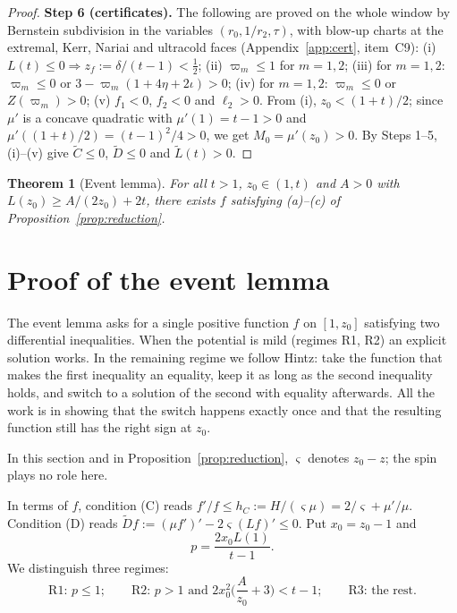 \documentclass[11pt]{amsart}
\newtheorem{theorem}{Theorem}[section]
\theoremstyle{definition}
\theoremstyle{remark}
\numberwithin{equation}{section}
\begin{document}
\begin{proof}
\smallskip\noindent\textbf{Step 6 (certificates).} The following are proved on the whole window by Bernstein subdivision in the variables
$(r_0,1/r_2,\tau)$, with blow-up charts at the extremal, Kerr, Nariai and ultracold faces (Appendix~\ref{app:cert},
item~C9):
(i) $L(t)\le0\Rightarrow z_f:=\delta/(t-1)<\frac12$;
(ii) $\varpi_m\le1$ for $m=1,2$;
(iii) for $m=1,2$: $\varpi_m\le0$ or $3-\varpi_m(1+4\eta+2\iota)>0$;
(iv) for $m=1,2$: $\varpi_m\le0$ or $Z(\varpi_m)>0$;
(v) $f_1<0$, $f_2<0$ and $\ell_2>0$.
From (i), $z_0<(1+t)/2$; since $\mu'$ is a concave quadratic with $\mu'(1)=t-1>0$ and
$\mu'((1+t)/2)=(t-1)^2/4>0$, we get $M_0=\mu'(z_0)>0$. By Steps 1--5, (i)--(v) give $\tilde C\le0$, $\tilde D\le0$ and
$\tilde L(t)>0$.
\end{proof}
\begin{theorem}[Event lemma]\label{thm:event}
For all $t>1$, $z_0\in(1,t)$ and $A>0$ with $L(z_0)\ge A/(2z_0)+2t$, there exists $f$ satisfying (a)--(c) of
Proposition~\ref{prop:reduction}.
\end{theorem}

\section{Proof of the event lemma}\label{sec:event}
The event lemma asks for a single positive function $f$ on $[1,z_0]$ satisfying two differential inequalities.
When the potential is mild (regimes R1, R2) an explicit solution works. In the remaining regime we follow Hintz:
take the function that makes the first inequality an equality, keep it as long as the second inequality holds, and
switch to a solution of the second with equality afterwards. All the work is in showing that the switch happens
exactly once and that the resulting function still has the right sign at $z_0$.

In this section and in Proposition~\ref{prop:reduction}, $\varsigma$ denotes $z_0-z$; the spin plays no role here.


In terms of $f$, condition (C) reads $f'/f\le h_C:=H/(\varsigma\mu)=2/\varsigma+\mu'/\mu$. Condition (D) reads
$\widetilde Df:=(\mu f')'-2\varsigma(Lf)'\le0$. Put $x_0=z_0-1$ and
\[
p=\frac{2x_0L(1)}{t-1}.
\]
We distinguish three regimes:
\[
\text{R1: }p\le1;\qquad\text{R2: }p>1\text{ and }2x_0^2\Big(\frac{A}{z_0}+3\Big)<t-1;\qquad\text{R3: the rest.}
\]
\end{document}
